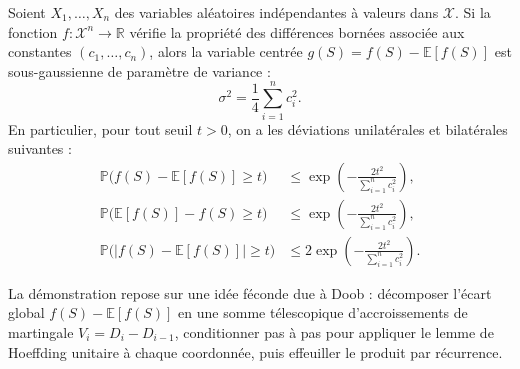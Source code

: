 \begin{theorem}
Soient $X_1, \dots, X_n$ des variables aléatoires indépendantes à valeurs dans $\mathcal{X}$. Si la fonction $f : \mathcal{X}^n \to \mathbb{R}$ vérifie la propriété des différences bornées associée aux constantes $(c_1, \dots, c_n)$, alors la variable centrée $g(S) = f(S) - \mathbb{E}[f(S)]$ est sous-gaussienne de paramètre de variance :
\begin{equation}
    \sigma^2 = \frac{1}{4} \sum_{i=1}^n c_i^2.
\end{equation}
En particulier, pour tout seuil $t > 0$, on a les déviations unilatérales et bilatérales suivantes :
\begin{align}
    \mathbb{P}\big(f(S) - \mathbb{E}[f(S)] \geqslant t\big) & \leqslant \exp\left( - \frac{2t^2}{\sum_{i=1}^n c_i^2} \right), \\
    \mathbb{P}\big(\mathbb{E}[f(S)] - f(S) \geqslant t\big) & \leqslant \exp\left( - \frac{2t^2}{\sum_{i=1}^n c_i^2} \right), \\
    \mathbb{P}\big(|f(S) - \mathbb{E}[f(S)]| \geqslant t\big) & \leqslant 2\exp\left( - \frac{2t^2}{\sum_{i=1}^n c_i^2} \right).
\end{align}
\end{theorem}

La démonstration repose sur une idée féconde due à Doob : décomposer l'écart global $f(S) - \mathbb{E}[f(S)]$ en une somme télescopique d'accroissements de martingale $V_i = D_i - D_{i-1}$, conditionner pas à pas pour appliquer le lemme de Hoeffding unitaire à chaque coordonnée, puis effeuiller le produit par récurrence.

